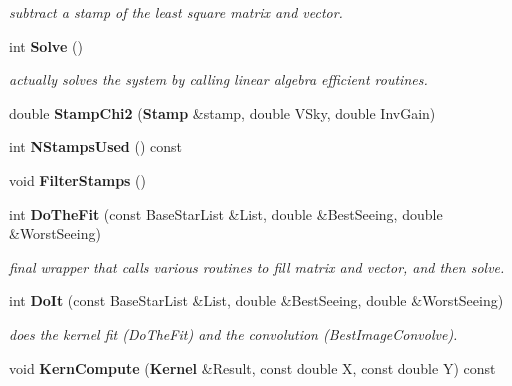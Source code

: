 \begin{CompactItemize}
\begin{CompactList}\small\item\em subtract a stamp of the least square matrix and vector.\item\end{CompactList}\item 
{}
int {\bf Solve} ()\label{class_kernelfit_a14}

\begin{CompactList}\small\item\em actually solves the system by calling linear algebra efficient routines.\item\end{CompactList}\item 
{}
double {\bf Stamp\-Chi2} ({\bf Stamp} \&stamp, double VSky, double Inv\-Gain)\label{class_kernelfit_a15}

\item 
{}
int {\bf NStamps\-Used} () const\label{class_kernelfit_a16}

\item 
{}
void {\bf Filter\-Stamps} ()\label{class_kernelfit_a17}

\item 
int {\bf Do\-The\-Fit} (const Base\-Star\-List \&List, double \&Best\-Seeing, double \&Worst\-Seeing)
\begin{CompactList}\small\item\em final wrapper that calls various routines to fill matrix and vector, and then solve.\item\end{CompactList}\item 
{}
int {\bf Do\-It} (const Base\-Star\-List \&List, double \&Best\-Seeing, double \&Worst\-Seeing)\label{class_kernelfit_a19}

\begin{CompactList}\small\item\em does the kernel fit (Do\-The\-Fit) and the convolution (Best\-Image\-Convolve).\item\end{CompactList}\item 
{}
void {\bf Kern\-Compute} ({\bf Kernel} \&Result, const double X, const double Y) const\label{class_kernelfit_a20}


\end{CompactItemize}
